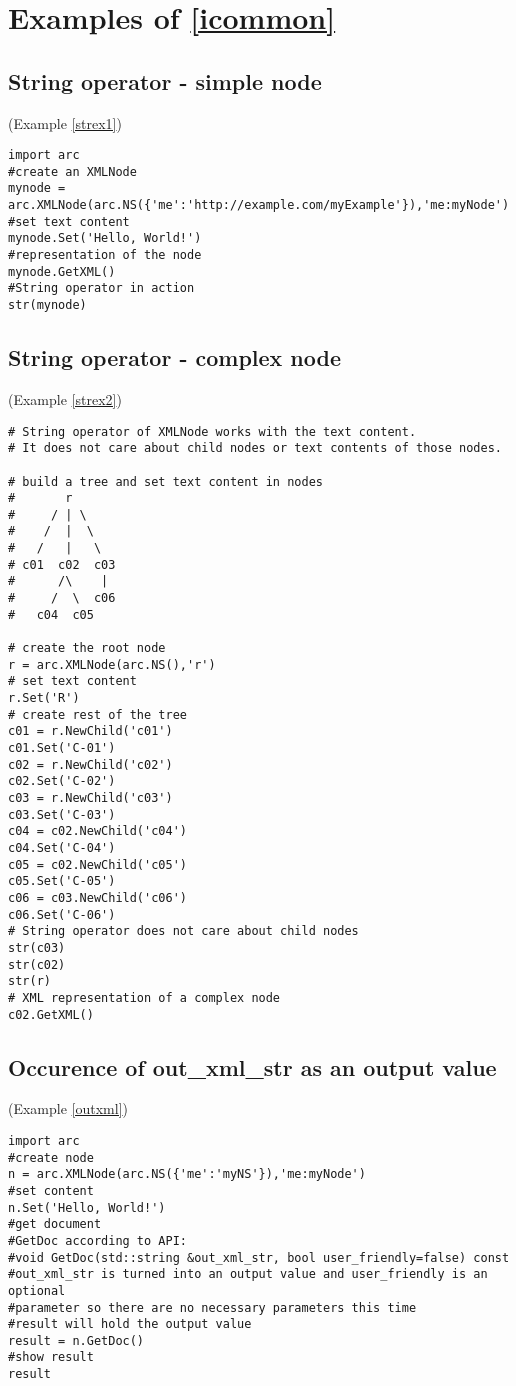 \section{Examples of \ref{icommon}}
\subsection{String operator - simple node}
(Example \ref{strex1})
\label{cstrex1}
\begin{verbatim}
import arc
#create an XMLNode
mynode = arc.XMLNode(arc.NS({'me':'http://example.com/myExample'}),'me:myNode')
#set text content
mynode.Set('Hello, World!')
#representation of the node
mynode.GetXML()
#String operator in action
str(mynode)
\end{verbatim}

\subsection{String operator - complex node}
(Example \ref{strex2})
\label{cstrex2}
\begin{verbatim}
# String operator of XMLNode works with the text content.
# It does not care about child nodes or text contents of those nodes.

# build a tree and set text content in nodes
#       r
#     / | \
#    /  |  \
#   /   |   \
# c01  c02  c03
#      /\    |
#     /  \  c06  
#   c04  c05

# create the root node
r = arc.XMLNode(arc.NS(),'r')
# set text content
r.Set('R')
# create rest of the tree
c01 = r.NewChild('c01')
c01.Set('C-01')
c02 = r.NewChild('c02')
c02.Set('C-02')
c03 = r.NewChild('c03')
c03.Set('C-03')
c04 = c02.NewChild('c04')
c04.Set('C-04')
c05 = c02.NewChild('c05')
c05.Set('C-05')
c06 = c03.NewChild('c06')
c06.Set('C-06')
# String operator does not care about child nodes
str(c03)
str(c02)
str(r)
# XML representation of a complex node
c02.GetXML()
\end{verbatim}

\subsection{Occurence of out\_xml\_str as an output value}
(Example \ref{outxml})
\label{coutxml}
\begin{verbatim}
import arc
#create node
n = arc.XMLNode(arc.NS({'me':'myNS'}),'me:myNode')
#set content
n.Set('Hello, World!')
#get document
#GetDoc according to API:
#void GetDoc(std::string &out_xml_str, bool user_friendly=false) const
#out_xml_str is turned into an output value and user_friendly is an optional 
#parameter so there are no necessary parameters this time
#result will hold the output value
result = n.GetDoc()
#show result
result
\end{verbatim}

